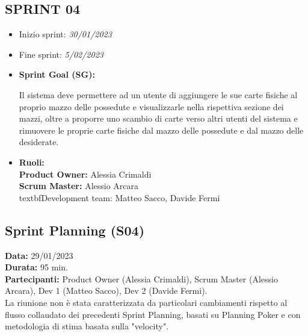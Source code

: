 \documentclass[a4paper, oneside]{article}
\newcommand\quattro{Scrum Master (Alessio Arcara), Dev 1 (Matteo Sacco), Dev 2 (Davide Fermi).}
\newcommand\quattroP{Product Owner (Alessia Crimaldi), }
\begin{document}
\begin{landscape}
        \section{SPRINT 04}
        \begin{itemize}
            \item Inizio sprint: \textit{30/01/2023}
            \item Fine sprint: \textit{5/02/2023}
        \end{itemize}
        \begin{itemize}
            \item \textbf{Sprint Goal (SG):} \\
            \begin{indent}
                \newline Il sistema deve permettere ad un utente di aggiungere le sue carte fisiche al proprio mazzo delle possedute e visualizzarle nella rispettiva sezione dei mazzi, oltre a proporre uno scambio di carte verso altri utenti del sistema e rimuovere le proprie carte fisiche dal mazzo delle possedute e dal mazzo delle desiderate.  \\
            \end{indent}
        \end{itemize}
        \begin{itemize}
            \item \textbf{Ruoli:}\\
            \textbf{Product Owner:} Alessia Crimaldi \\
            \textbf{Scrum Master:} Alessio Arcara \\
            textbf{Development team:} Matteo Sacco, Davide Fermi \\
        \end{itemize}
        \vspace{2mm} %
        \subsection{Sprint Planning (S04)}
        \textbf{Data:} 29/01/2023\\
        \textbf{Durata:} 95 min.\\
        \textbf{Partecipanti:} \quattroP \quattro \\
        \newline La riunione non è stata caratterizzata da particolari cambiamenti rispetto al flusso collaudato dei precedenti Sprint Planning, basati su Planning Poker e con metodologia di stima basata sulla "velocity".


\end{landscape}
\end{document}
